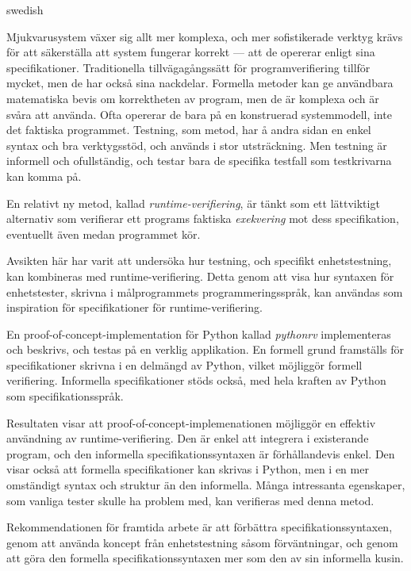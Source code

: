 \begin{foreignabstract}{swedish}

Mjukvarusystem växer sig allt mer komplexa, och mer sofistikerade verktyg
krävs för att säkerställa att system fungerar korrekt --- att de opererar
enligt sina specifikationer. Traditionella tillvägagångssätt för
programverifiering tillför mycket, men de har också sina nackdelar. Formella
metoder kan ge användbara matematiska bevis om korrektheten av program, men de
är komplexa och är svåra att använda. Ofta opererar de bara på en
konstruerad systemmodell, inte det faktiska programmet. Testning, som metod,
har å andra sidan en enkel syntax och bra verktygsstöd, och används i stor
utsträckning. Men testning är informell och ofullständig, och testar bara de
specifika testfall som testkrivarna kan komma på.

En relativt ny metod, kallad \textit{runtime-verifiering}, är tänkt som ett
lättviktigt alternativ som verifierar ett programs faktiska \textit{exekvering}
mot dess specifikation, eventuellt även medan programmet kör.

Avsikten här har varit att undersöka hur testning, och specifikt
enhetstestning, kan kombineras med runtime-verifiering. Detta genom att visa
hur syntaxen för enhetstester, skrivna i målprogrammets programmeringsspråk, kan
användas som inspiration för specifikationer för runtime-verifiering.

En proof-of-concept-implementation för Python kallad \textit{pythonrv}
implementeras och beskrivs, och testas på en verklig applikation. En formell
grund framställs för specifikationer skrivna i en delmängd av Python, vilket
möjliggör formell verifiering. Informella specifikationer stöds också, med hela
kraften av Python som specifikationsspråk.

Resultaten visar att proof-of-concept-implemenationen möjliggör en effektiv
användning av runtime-verifiering. Den är enkel att integrera i existerande
program, och den informella specifikationssyntaxen är förhållandevis enkel. Den
visar också att formella specifikationer kan skrivas i Python, men i en mer
omständigt syntax och struktur än den informella. Många intressanta egenskaper,
som vanliga tester skulle ha problem med, kan verifieras med denna metod.

Rekommendationen för framtida arbete är att förbättra specifikationssyntaxen,
genom att använda koncept från enhetstestning såsom förväntningar, och genom
att göra den formella specifikationssyntaxen mer som den av sin informella
kusin.

\end{foreignabstract}
